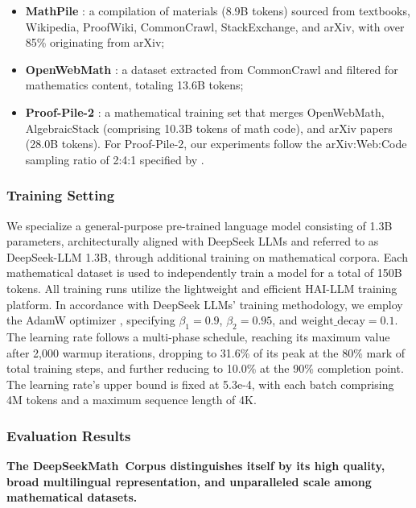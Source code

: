 \begin{itemize}[topsep=0pt]
    \item \textbf{MathPile} \citep{mathpile}: a compilation of materials (8.9B tokens) sourced from textbooks, Wikipedia, ProofWiki, CommonCrawl, StackExchange, and arXiv, with over 85\% originating from arXiv;
    \item \textbf{OpenWebMath} \citep{openwebmath}: a dataset extracted from CommonCrawl and filtered for mathematics content, totaling 13.6B tokens;
    \item \textbf{Proof-Pile-2} \citep{llemma}: a mathematical training set that merges OpenWebMath, AlgebraicStack (comprising 10.3B tokens of math code), and arXiv papers (28.0B tokens). For Proof-Pile-2, our experiments follow the arXiv:Web:Code sampling ratio of 2:4:1 specified by \cite{llemma}.
\end{itemize}

\subsubsection{Training Setting}
\label{sec:quality-policy}
We specialize a general-purpose pre-trained language model consisting of 1.3B parameters, architecturally aligned with DeepSeek LLMs \citep{deepseek-llm} and referred to as DeepSeek-LLM 1.3B, through additional training on mathematical corpora. Each mathematical dataset is used to independently train a model for a total of 150B tokens. All training runs utilize the lightweight and efficient HAI-LLM \citep{haillm} training platform. In accordance with DeepSeek LLMs' training methodology, we employ the AdamW optimizer \citep{adamW}, specifying $\beta_1=0.9$, $\beta_2=0.95$, and $\mathrm{weight\_decay}=0.1$. The learning rate follows a multi-phase schedule, reaching its maximum value after 2,000 warmup iterations, dropping to 31.6\% of its peak at the 80\% mark of total training steps, and further reducing to 10.0\% at the 90\% completion point. The learning rate's upper bound is fixed at 5.3e-4, with each batch comprising 4M tokens and a maximum sequence length of 4K.

\subsubsection{Evaluation Results}

\textbf{The DeepSeekMath~Corpus distinguishes itself by its high quality, broad multilingual representation, and unparalleled scale among mathematical datasets.}

